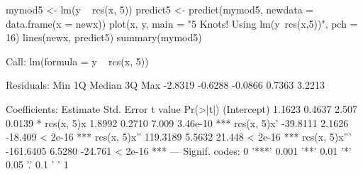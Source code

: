 \begin{Schunk}
\begin{Sinput}
 mymod5 <- lm(y ~ rcs(x, 5))
 predict5 <- predict(mymod5, newdata = data.frame(x = newx))
 plot(x, y, main = "5 Knots! Using lm(y~rcs(x,5))", pch = 16)
 lines(newx, predict5)
 summary(mymod5)
\end{Sinput}
\begin{Soutput}
Call:
lm(formula = y ~ rcs(x, 5))

Residuals:
    Min      1Q  Median      3Q     Max 
-2.8319 -0.6288 -0.0866  0.7363  3.2213 

Coefficients:
               Estimate Std. Error t value Pr(>|t|)    
(Intercept)      1.1623     0.4637   2.507   0.0139 *  
rcs(x, 5)x       1.8992     0.2710   7.009 3.46e-10 ***
rcs(x, 5)x'    -39.8111     2.1626 -18.409  < 2e-16 ***
rcs(x, 5)x''   119.3189     5.5632  21.448  < 2e-16 ***
rcs(x, 5)x''' -161.6405     6.5280 -24.761  < 2e-16 ***
---
Signif. codes:  0 '***' 0.001 '**' 0.01 '*' 0.05 '.' 0.1 ' ' 1 


\end{Soutput}
\end{Schunk}

